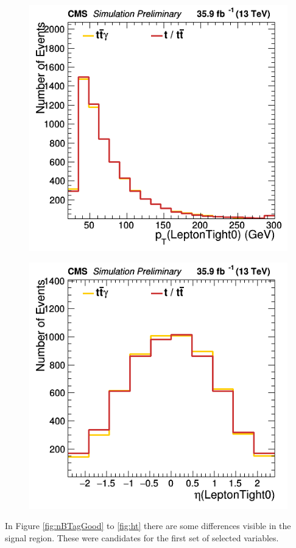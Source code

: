 \documentclass[11pt]{scrartcl}
\begin{document}
\begin{figure}[H]
\centering
\begin{minipage}{.5\textwidth}
  \centering
  \includegraphics[width=0.75\linewidth]{figures/Notused/LeptonTight0_pt.png}
  \label{fig:LeptonTight0pt}
\end{minipage}%
\begin{minipage}{.5\textwidth}
  \centering
  \includegraphics[width=0.75\linewidth]{figures/Notused/LeptonTight0_eta.png}
  \label{fig:LeptonTight0eta}
\end{minipage}
\end{figure}

In Figure \ref{fig:nBTagGood} to \ref{fig:ht} there are some differences visible in the signal region. These were candidates for the first set of selected variables. 
\end{document}
